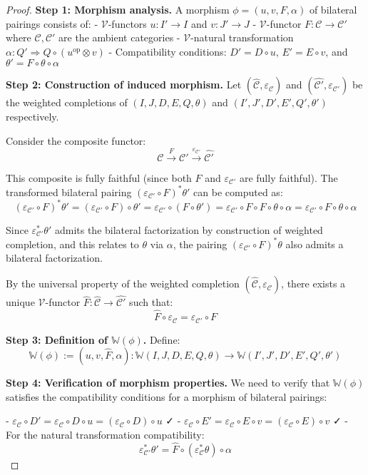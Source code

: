 \documentclass[11pt]{article}
\theoremstyle{plain}
\theoremstyle{definition}
\theoremstyle{remark}
\newcommand{\V}{\mathcal{V}}
\newcommand{\C}{\mathcal{C}}
\newcommand{\op}{\mathrm{op}}
\newcommand{\wh}[1]{\widehat{#1}}
\begin{document}
\begin{proof}
\textbf{Step 1: Morphism analysis.}
A morphism $\phi = (u, v, F, \alpha)$ of bilateral pairings consists of:
- $\V$-functors $u : I' \to I$ and $v : J' \to J$
- $\V$-functor $F : \C \to \C'$ where $\C, \C'$ are the ambient categories
- $\V$-natural transformation $\alpha : Q' \Rightarrow Q \circ (u^{\op} \otimes v)$
- Compatibility conditions: $D' = D \circ u$, $E' = E \circ v$, and $\theta' = F \circ \theta \circ \alpha$

\textbf{Step 2: Construction of induced morphism.}
Let $(\wh{\C}, \varepsilon_\C)$ and $(\wh{\C'}, \varepsilon_{\C'})$ be the weighted completions of $(I, J, D, E, Q, \theta)$ and $(I', J', D', E', Q', \theta')$ respectively.

Consider the composite functor:
$$\C \xrightarrow{F} \C' \xrightarrow{\varepsilon_{\C'}} \wh{\C'}$$

This composite is fully faithful (since both $F$ and $\varepsilon_{\C'}$ are fully faithful). The transformed bilateral pairing $(\varepsilon_{\C'} \circ F)^* \theta'$ can be computed as:
$$(\varepsilon_{\C'} \circ F)^* \theta' = (\varepsilon_{\C'} \circ F) \circ \theta' = \varepsilon_{\C'} \circ (F \circ \theta') = \varepsilon_{\C'} \circ F \circ F \circ \theta \circ \alpha = \varepsilon_{\C'} \circ F \circ \theta \circ \alpha$$

Since $\varepsilon_{\C'}^* \theta'$ admits the bilateral factorization by construction of weighted completion, and this relates to $\theta$ via $\alpha$, the pairing $(\varepsilon_{\C'} \circ F)^* \theta$ also admits a bilateral factorization.

By the universal property of the weighted completion $(\wh{\C}, \varepsilon_\C)$, there exists a unique $\V$-functor $\wh{F} : \wh{\C} \to \wh{\C'}$ such that:
$$\wh{F} \circ \varepsilon_\C = \varepsilon_{\C'} \circ F$$

\textbf{Step 3: Definition of $\mathbb{W}(\phi)$.}
Define:
$$\mathbb{W}(\phi) := (u, v, \wh{F}, \alpha) : \mathbb{W}(I, J, D, E, Q, \theta) \to \mathbb{W}(I', J', D', E', Q', \theta')$$

\textbf{Step 4: Verification of morphism properties.}
We need to verify that $\mathbb{W}(\phi)$ satisfies the compatibility conditions for a morphism of bilateral pairings:

- $\varepsilon_\C \circ D' = \varepsilon_\C \circ D \circ u = (\varepsilon_\C \circ D) \circ u$ ✓
- $\varepsilon_\C \circ E' = \varepsilon_\C \circ E \circ v = (\varepsilon_\C \circ E) \circ v$ ✓
- For the natural transformation compatibility:
$$\varepsilon_{\C'}^* \theta' = \wh{F} \circ (\varepsilon_\C^* \theta) \circ \alpha$$


\end{proof}
\end{document}

